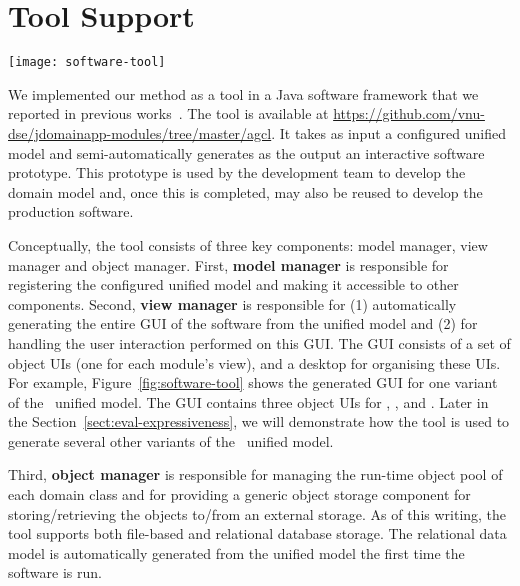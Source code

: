 %
\section{Tool Support}
\label{sect:tool} %
%
\begin{figure*}[ht]
	\centering
	\texttt{[image: software-tool]}
	\caption{The GUI of \courseman~software generated by the tool: (1) desktop, 
		(2-4) the object UIs of , , and .} %
	\label{fig:software-tool}
\end{figure*}

We implemented our method as a tool in a Java software framework that we reported in previous works~\cite{le_domain_2018,le_generative_2017, le_jdomainapp_2017}. The tool is available at \url{https://github.com/vnu-dse/jdomainapp-modules/tree/master/agcl}. It takes as input a configured unified model and semi-automatically generates as the output an interactive software prototype. This prototype is used by the development team to develop the domain model and, once this is completed, may also be reused to develop the production software.

Conceptually, the tool consists of three key components: model manager, view manager and object manager. First, \textbf{model manager} is responsible for registering the configured unified model and making it accessible to other components. 
Second, \textbf{view manager} is responsible for (1) automatically generating the entire GUI of the software from the unified model and (2) for handling the user interaction performed on this GUI. The GUI consists of a set of object UIs (one for each module's view), and a desktop for organising these UIs. For example, Figure~\ref{fig:software-tool} shows the generated GUI for one variant of the \courseman~unified model. The GUI contains three object UIs for , , and .
Later in the Section~\ref{sect:eval-expressiveness}, we will demonstrate how the tool is used to generate several other variants of the \courseman~unified model. 

Third, \textbf{object manager} is responsible for managing the run-time object pool of each domain class and for providing a generic object storage component for storing/retrieving the objects to/from an external storage. As of this writing, the tool supports both file-based and relational database storage. The relational data model is automatically generated from the unified model the first time the software is run.